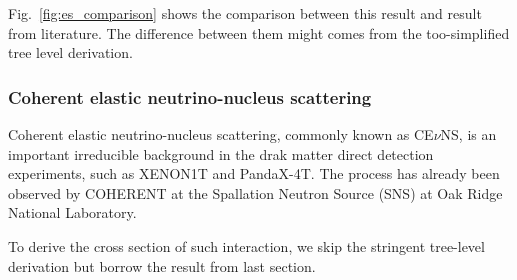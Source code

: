 Fig.~\ref{fig:es_comparison} shows the comparison between this result and result from literature.
The difference between them might comes from the too-simplified tree level derivation.

\subsubsection{Coherent elastic neutrino-nucleus scattering}

Coherent elastic neutrino-nucleus scattering, commonly known as CE$\nu$NS,
is an important irreducible background in the drak matter direct detection experiments,
such as XENON1T\cite{aprile_search_2021} and PandaX-4T\cite{ma_search_2023}.
The process has already been observed by COHERENT\cite{akimov_observation_2017} at the
Spallation Neutron Source (SNS) at Oak Ridge National Laboratory.

To derive the cross section of such interaction,
we skip the stringent tree-level derivation but borrow the result from last section.


